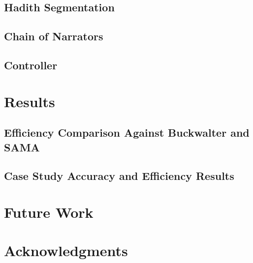 \documentclass[11pt,letterpaper]{article}
\begin{document}
\subsection{Hadith Segmentation}

\subsection{Chain of Narrators} 

\subsection{Controller}


\section{Results}
\label{sec:results}

\subsection{Efficiency Comparison Against Buckwalter and SAMA}

\subsection{Case Study Accuracy and Efficiency Results}


\section{Future Work}






\section*{Acknowledgments}



\end{document}

